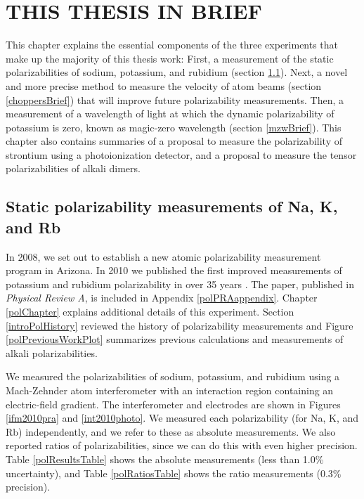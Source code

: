 \chapter{THIS THESIS IN BRIEF}

This chapter explains the essential components of the three experiments that make up the majority of this thesis work: First, a measurement of the static polarizabilities of sodium, potassium, and rubidium (section \ref{polBrief}). Next, a novel and more precise method to measure the velocity of atom beams (section \ref{choppersBrief}) that will improve future polarizability measurements. Then, a measurement of a wavelength of light at which the dynamic polarizability of potassium is zero, known as magic-zero wavelength (section \ref{mzwBrief}). This chapter also contains summaries of a proposal to measure the polarizability of strontium using a photoionization detector, and a proposal to measure the tensor polarizabilities of alkali dimers.



\pagebreak
\section{Static polarizability measurements of Na, K, and Rb}
\label{polBrief}

In 2008, we set out to establish a new atomic polarizability measurement program in Arizona. In 2010 we published the first improved measurements of potassium and rubidium polarizability in over 35 years \cite{Hol10}. The paper, published in \emph{Physical Review A}, is included in Appendix \ref{polPRAappendix}. Chapter \ref{polChapter} explains additional details of this experiment. Section \ref{introPolHistory} reviewed the history of polarizability measurements and Figure \ref{polPreviousWorkPlot} summarizes previous calculations and measurements of alkali polarizabilities.

We measured the polarizabilities of sodium, potassium, and rubidium using a Mach-Zehnder atom interferometer with an interaction region containing an electric-field gradient. The interferometer and electrodes are shown in Figures \ref{ifm2010pra} and \ref{int2010photo}. We measured each polarizability (for Na, K, and Rb) independently, and we refer to these as absolute measurements. We also reported ratios of polarizabilities, since we can do this with even higher precision. Table \ref{polResultsTable} shows the absolute measurements (less than 1.0\% uncertainty), and Table \ref{polRatiosTable} shows the ratio measurements (0.3\% precision). 


